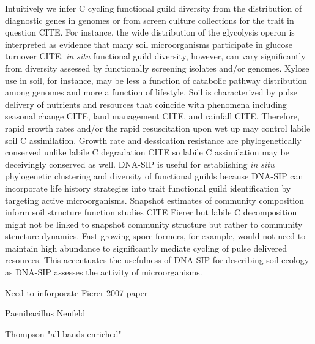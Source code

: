 Intuitively we infer C cycling functional guild diversity from the distribution
of diagnostic genes in genomes or from screen culture collections for the trait
in question CITE. For instance, the wide distribution of the glycolysis operon
is interpreted as evidence that many soil microorganisms participate in glucose
turnover CITE. \textit{in situ} functional guild diversity, however, can vary
significantly from diversity assessed by functionally screening isolates
and/or genomes. Xylose use in soil, for instance, may be less a function of
catabolic pathway distribution among genomes and more a function of lifestyle.
Soil is characterized by pulse delivery of nutrients and resources that
coincide with phenomena including seasonal change CITE, land management CITE,
and rainfall CITE. Therefore, rapid growth rates and/or the rapid resuscitation
upon wet up may control labile soil C assimilation. Growth rate and dessication
resistance are phylogenetically conserved unlike labile C degradation CITE so
labile C assimilation may be deceivingly conserved as well. DNA-SIP is useful
for establishing \textit{in situ} phylogenetic clustering and diversity of
functional guilds because DNA-SIP can incorporate life history strategies into
trait functional guild identification by targeting active microorganisms.
Snapshot estimates of community composition inform soil structure function
studies CITE Fierer but labile C decomposition might not be linked to snapshot
community structure but rather to community structure dynamics. Fast growing
spore formers, for example, would not need to maintain high abundance to
significantly mediate cycling of pulse delivered resources. This accentuates
the usefulness of DNA-SIP for describing soil ecology as DNA-SIP assesses the
activity of microorganisms. 

Need to inforporate Fierer 2007 paper

Paenibacillus Neufeld

Thompson "all bands enriched"

